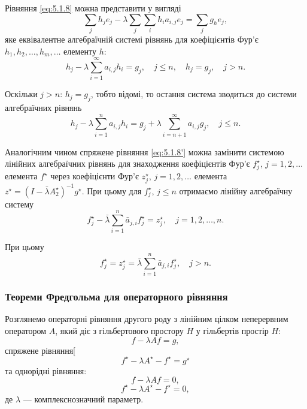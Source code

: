 Рівняння \eqref{eq:5.1.8} можна представити у вигляді
\begin{equation*}
    \sum_j h_j e_j - \lambda \sum_j \sum_i h_i a_{i, j} e_j = \sum_j g_h e_j,
\end{equation*}
яке еквівалентне алгебраїчній системі рівнянь для коефіцієнтів Фур'є $h_1, h_2, \ldots, h_m, \ldots$ елементу $h$:
\begin{equation*}
    h_j - \lambda \sum_{i = 1}^\infty a_{i, j} h_i = g_j, \quad j \le n, \quad h_j = g_j, \quad j > n.
\end{equation*}

Оскільки $j > n$: $h_j = g_j$, тобто відомі, то остання система зводиться до системи алгебраїчних рівнянь
\begin{equation}
    \label{eq:5.1.9}
    h_j - \lambda \sum_{i = 1}^n a_{i, j} h_i = g_j + \lambda \sum_{i = n + 1}^\infty a_{i, j} g_j, \quad j \le n.
\end{equation}

Аналогічним чином спряжене рівняння \eqref{eq:5.1.8'} можна замінити системою лінійних алгебраїчних рівнянь для знаходження коефіцієнтів Фур'є $f_j^\star$, $j = 1, 2, \ldots$ елемента $f^\star$ через коефіцієнти Фур'є $z_j^\star$, $j = 1, 2, \ldots$ елемента $z^\star = (I - \bar \lambda A_2^\star)^{-1} g^\star$. При цьому для $f_j^\star$, $j \le n$ отримаємо лінійну алгебраїчну систему
\begin{equation}
    \label{eq:5.1.9'}
    f_j^\star - \bar \lambda \sum_{i = 1}^n \bar a_{j, i} f_j^\star = z_j^\star, \quad j = 1, 2, \ldots, n.
\end{equation}

При цьому
\begin{equation}
    \label{eq:5.1.10}
    f_j^\star = z_j^\star = \bar \lambda \sum_{i = 1}^n \bar a_{j, i} f_j^\star, \quad j > n.
\end{equation}

\subsubsection{Теореми Фредгольма для операторного рівняння}

Розглянемо операторні рівняння другого роду з лінійним цілком неперервним оператором $A$, який діє з гільбертового простору $H$ у гільбертів простір $H$:
\begin{equation}
    \label{eq:5.1.11}
    f - \lambda A f = g,
\end{equation}
спряжене рівняння[
\begin{equation}
    \label{eq:5.1.12}
    f^\star - \lambda A^\star - f^\star = g^\star
\end{equation}
та однорідні рівняння:
\begin{equation}
    \label{eq:5.1.11'}
    f - \lambda A f = 0,
\end{equation}
\begin{equation}
    \label{eq:5.1.12'}
    f^\star - \lambda A^\star - f^\star = 0,
\end{equation}
де $\lambda$ --- комплекснозначний параметр. \medskip

